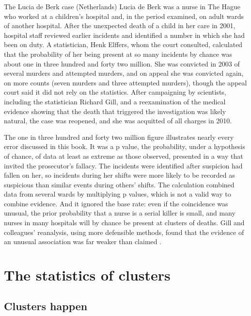 \begin{casebox}{The Lucia de Berk case (Netherlands)}
Lucia de Berk was a nurse in The Hague who worked at a children's hospital and, in the period examined, on adult wards of another hospital. After the unexpected death of a child in her care in 2001, hospital staff reviewed earlier incidents and identified a number in which she had been on duty. A statistician, Henk Elffers, whom the court consulted, calculated that the probability of her being present at so many incidents by chance was about one in three hundred and forty two million. She was convicted in 2003 of several murders and attempted murders, and on appeal she was convicted again, on more counts (seven murders and three attempted murders), though the appeal court said it did not rely on the statistics. After campaigning by scientists, including the statistician Richard Gill, and a reexamination of the medical evidence showing that the death that triggered the investigation was likely natural, the case was reopened, and she was acquitted of all charges in 2010.
\end{casebox}

The one in three hundred and forty two million figure illustrates nearly every error discussed in this book. It was a p value, the probability, under a hypothesis of chance, of data at least as extreme as those observed, presented in a way that invited the prosecutor's fallacy. The incidents were identified after suspicion had fallen on her, so incidents during her shifts were more likely to be recorded as suspicious than similar events during others' shifts. The calculation combined data from several wards by multiplying p values, which is not a valid way to combine evidence. And it ignored the base rate: even if the coincidence was unusual, the prior probability that a nurse is a serial killer is small, and many nurses in many hospitals will by chance be present at clusters of deaths. Gill and colleagues' reanalysis, using more defensible methods, found that the evidence of an unusual association was far weaker than claimed \citep{meester2006,gill2018}.

\section{The statistics of clusters}

\subsection{Clusters happen}

